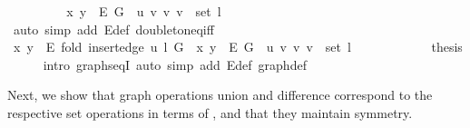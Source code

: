 \begin{isabellebody}
\ \ \ \ \isamarkupfalse%
\ \isamarkupfalse%
\ {\isachardoublequoteopen}{\isachardot}{\kern0pt}{\isachardot}{\kern0pt}{\isachardot}{\kern0pt}\ {\isasymlongleftrightarrow}\ {\isacharbraceleft}{\kern0pt}x{\isacharcomma}{\kern0pt}\ y{\isacharbraceright}{\kern0pt}\ {\isasymin}\ E\ G\ {\isasymunion}\ {\isacharbraceleft}{\kern0pt}{\isacharbraceleft}{\kern0pt}u{\isacharcomma}{\kern0pt}\ v{\isacharbraceright}{\kern0pt}\ {\isacharbar}{\kern0pt}v{\isachardot}{\kern0pt}\ v\ {\isasymin}\ set\ l{\isacharbraceright}{\kern0pt}{\isachardoublequoteclose}\isanewline
\ \ \ \ \ \ \isamarkupfalse%
\ {\isacharparenleft}{\kern0pt}auto\ simp\ add{\isacharcolon}{\kern0pt}\ E{\isacharunderscore}{\kern0pt}def\ doubleton{\isacharunderscore}{\kern0pt}eq{\isacharunderscore}{\kern0pt}iff{\isacharparenright}{\kern0pt}\isanewline
\ \ \ \ \isamarkupfalse%
\ \isamarkupfalse%
\ {\isachardoublequoteopen}{\isacharbraceleft}{\kern0pt}x{\isacharcomma}{\kern0pt}\ y{\isacharbraceright}{\kern0pt}\ {\isasymin}\ E\ {\isacharparenleft}{\kern0pt}fold\ {\isacharparenleft}{\kern0pt}insert{\isacharunderscore}{\kern0pt}edge\ u{\isacharparenright}{\kern0pt}\ l\ G{\isacharparenright}{\kern0pt}\ {\isasymlongleftrightarrow}\ {\isacharbraceleft}{\kern0pt}x{\isacharcomma}{\kern0pt}\ y{\isacharbraceright}{\kern0pt}\ {\isasymin}\ E\ G\ {\isasymunion}\ {\isacharbraceleft}{\kern0pt}{\isacharbraceleft}{\kern0pt}u{\isacharcomma}{\kern0pt}\ v{\isacharbraceright}{\kern0pt}\ {\isacharbar}{\kern0pt}v{\isachardot}{\kern0pt}\ v\ {\isasymin}\ set\ l{\isacharbraceright}{\kern0pt}{\isachardoublequoteclose}\isanewline
\ \ \ \ \ \ \isacommand{{\isachardot}{\kern0pt}}\isamarkupfalse%
\ \isacommand{{\isacharbraceright}{\kern0pt}}\isamarkupfalse%
\isanewline
\ \ \isamarkupfalse%
\ {\isacharquery}{\kern0pt}thesis\isanewline
\ \ \ \ \isamarkupfalse%
\ {\isacharparenleft}{\kern0pt}intro\ graphs{\isacharunderscore}{\kern0pt}eqI{\isacharparenright}{\kern0pt}\ {\isacharparenleft}{\kern0pt}auto\ simp\ add{\isacharcolon}{\kern0pt}\ E{\isacharunderscore}{\kern0pt}def\ graph{\isacharunderscore}{\kern0pt}def{\isacharparenright}{\kern0pt}\isanewline
{}\isamarkupfalse%
%
\endisatagproof
{\isafoldproof}%
%
\isadelimproof
%
\endisadelimproof
%
\begin{isamarkuptext}%
Next, we show that graph operations union and difference correspond to the respective set operations in
terms of , and that they maintain symmetry.%
\end{isamarkuptext}\isamarkuptrue%

\end{isabellebody}
